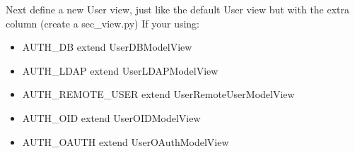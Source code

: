 \documentclass[letterpaper,10pt,english]{sphinxmanual}
\begin{document}
Next define a new User view, just like the default User view but with the extra column (create a sec\_view.py)
If your using:
\begin{itemize}
\item {} 
AUTH\_DB extend UserDBModelView

\item {} 
AUTH\_LDAP extend UserLDAPModelView

\item {} 
AUTH\_REMOTE\_USER extend UserRemoteUserModelView

\item {} 
AUTH\_OID extend UserOIDModelView

\item {} 
AUTH\_OAUTH extend UserOAuthModelView

\end{itemize}
\end{document}
